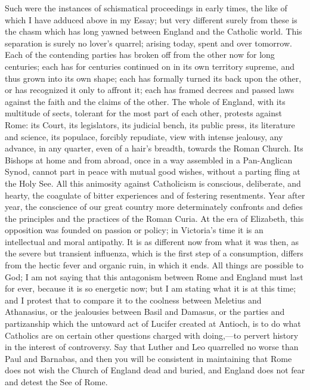 Such were the instances of schismatical proceedings in early times,
the like of which I have adduced above in my Essay; but very
different surely from these is the chasm which has long yawned between
England and the Catholic world. This separation is surely no lover's
quarrel; arising today, spent and over tomorrow. Each of the
contending parties has broken off from the other now for long
centuries; each has for centuries continued on in its own territory
supreme, and thus grown into its own shape; each has formally turned
its back upon the other, or has recognized it only to affront it; each
has framed decrees and passed laws against the faith and the claims of
the other. The whole of England, with its multitude of sects, tolerant
for the most part of each other, protests against Rome: its Court, its
legislators, its judicial bench, its public press, its literature and
science, its populace, forcibly repudiate, view with intense jealousy,
any advance, in any quarter, even of a hair's breadth, towards the
Roman Church. Its Bishops at home and from abroad, once in a way
assembled in a Pan-Anglican Synod, cannot part in peace with mutual
good wishes, without a parting fling at the Holy See. All this
animosity against Catholicism is conscious, deliberate, and hearty,
the coagulate of bitter experiences and of festering resentments. Year
after year, the conscience of our great country more determinately
confronts and defies the principles and the practices of the Roman
Curia. At the era of Elizabeth, this opposition was founded on passion
or policy; in Victoria's time it is an intellectual and moral
antipathy. It is as different now from what it was then, as the severe
but transient influenza, which is the first step of a consumption,
differs from the hectic fever and organic ruin, in which it ends. All
things are possible to God; I am not saying that this antagonism
between Rome and England must last for ever, because it is so
energetic now; but I am stating what it is at this time; and I
protest that to compare it to the coolness between Meletius and
Athanasius, or the jealousies between Basil and Damasus, or the
parties and partizanship which the untoward act of Lucifer created at
Antioch, is to do what Catholics are on certain other questions
charged with doing,—to pervert history in the interest of
controversy. Say that Luther and Leo quarrelled no worse than Paul and
Barnabas, and then you will be consistent in maintaining that Rome
does not wish the Church of England dead and buried, and England does
not fear and detest the See of Rome.

